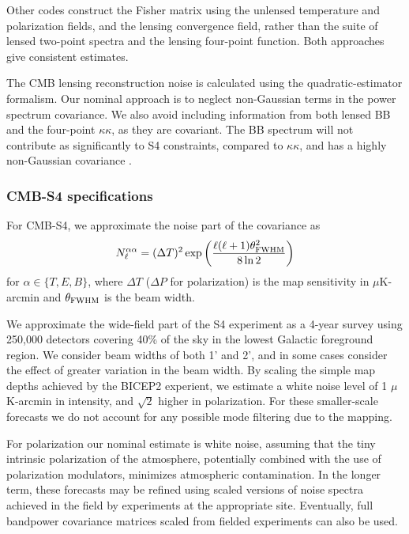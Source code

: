 Other codes construct the Fisher matrix using the unlensed temperature and polarization fields, and the lensing convergence field, rather than the suite of lensed two-point spectra and the lensing four-point function. Both approaches give consistent estimates.

The CMB lensing reconstruction noise is calculated using the \cite{Hu:2001kj} quadratic-estimator formalism. Our nominal approach is to neglect non-Gaussian terms in the power spectrum covariance. We also avoid including information from both lensed BB and the four-point $\kappa \kappa$, as they are covariant. The BB spectrum will not contribute as significantly to S4 constraints, compared to $\kappa \kappa$, and has a highly non-Gaussian covariance \cite{BenoitLevy:2012va}. 

\subsubsection{CMB-S4 specifications}
For CMB-S4, we approximate the noise part of the covariance as
%
\begin{equation}
N^{\alpha \alpha}_\ell = (\Delta T)^2 \exp \left( \frac{\ell(\ell + 1) \theta^2_{\rm FWHM}}{8 \ln 2} \right)
\end{equation}
%
for $\alpha \in \{T, E, B\}$, where $\Delta T$ ($\Delta P$ for polarization) is the map sensitivity in $\mu$K-arcmin and $\theta_{\rm FWHM}$ is the beam width. 

We approximate the wide-field part of the S4 experiment as a 4-year survey using 250,000 detectors covering 40\% of the sky in the lowest Galactic foreground region. We consider beam widths of both 1' and 2', and in some cases consider the effect of greater variation in the beam width. By scaling the simple map depths achieved by the BICEP2 experient, we estimate a white noise level of 1 $\mu$K-arcmin in intensity, and $\sqrt{2}$ higher in polarization. For these smaller-scale forecasts we do not account for any possible mode filtering due to the mapping.

For polarization our nominal estimate is white noise, assuming that the tiny intrinsic polarization of the atmosphere, potentially combined with the use of polarization modulators, minimizes atmospheric contamination. In the longer term, these forecasts may be refined using scaled versions of noise spectra achieved in the field by experiments at the appropriate site. Eventually, full bandpower covariance matrices scaled from fielded experiments can also be used.


